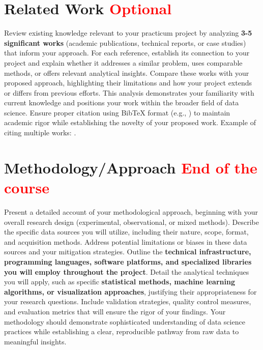 \documentclass[12pt, onecolumn]{IEEEtran}
\begin{document}
\section{Related Work \textcolor{red}{Optional}}
Review existing knowledge relevant to your practicum project by analyzing \textbf{ 3-5 significant works} (academic publications, technical reports, or case studies) that inform your approach. For each reference, establish its connection to your project and explain whether it addresses a similar problem, uses comparable methods, or offers relevant analytical insights. Compare these works with your proposed approach, highlighting their limitations and how your project extends or differs from previous efforts. This analysis demonstrates your familiarity with current knowledge and positions your work within the broader field of data science. Ensure proper citation using BibTeX format (e.g., \cite{dummy2024}) to maintain academic rigor while establishing the novelty of your proposed work. Example of citing multiple works: \cite{doe2023example, SampleRLlib, SampleTensor}.



\section{Methodology/Approach \textcolor{red}{End of the course}}
Present a detailed account of your methodological approach, beginning with your overall research design (experimental, observational, or mixed methods). Describe the specific data sources you will utilize, including their nature, scope, format, and acquisition methods. Address potential limitations or biases in these data sources and your mitigation strategies. Outline the \textbf{technical infrastructure, programming languages, software platforms, and specialized libraries you will employ throughout the project}. Detail the analytical techniques you will apply, such as specific \textbf{statistical methods, machine learning algorithms, or visualization approaches}, justifying their appropriateness for your research questions. Include validation strategies, quality control measures, and evaluation metrics that will ensure the rigor of your findings. Your methodology should demonstrate sophisticated understanding of data science practices while establishing a clear, reproducible pathway from raw data to meaningful insights.
\end{document}
